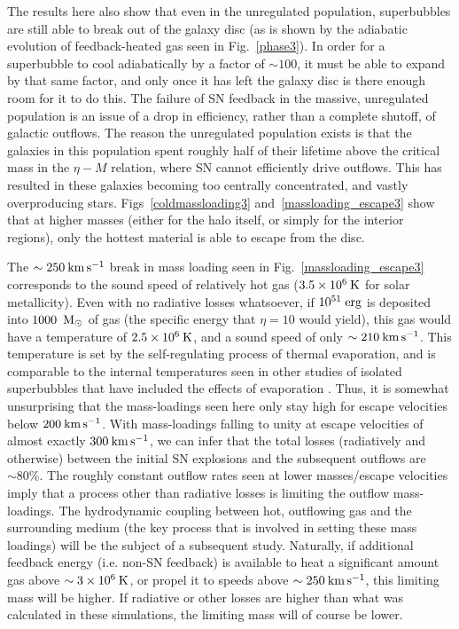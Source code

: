 The results here also show that even in the unregulated population, superbubbles
are still able to break out of the galaxy disc (as is shown by the adiabatic
evolution of feedback-heated gas seen in Fig.~\ref{phase3}).  In order for a
superbubble to cool adiabatically by a factor of $\sim100$, it must be able to
expand by that same factor, and only once it has left the galaxy disc is there
enough room for it to do this.  The failure of SN feedback in the massive,
unregulated population is an issue of a drop in efficiency, rather than a
complete shutoff, of galactic outflows.  The reason the unregulated population
exists is that the galaxies in this population spent roughly half of their
lifetime above the critical mass in the $\eta-M$ relation, where SN cannot
efficiently drive outflows.  This has resulted in these galaxies becoming too
centrally concentrated, and vastly overproducing stars.
Figs~\ref{coldmassloading3} and~\ref{massloading_escape3} show that at higher
masses (either for the halo itself, or simply for the interior regions), only
the hottest material is able to escape from the disc.  

The $\sim250\>{\rm km}\,{\rm s}^{-1}$ break in mass loading seen in
Fig.~\ref{massloading_escape3} corresponds to the sound speed of relatively hot
gas ($3.5\times10^6\>{\rm K}$ for solar metallicity).  Even with no radiative losses
whatsoever, if $10^{51}\;\rm{erg}$ is deposited into $1000\;\>{\rm M_{\odot}}$ of gas (the
specific energy that $\eta=10$ would  yield), this gas would have a temperature
of $2.5\times10^6\>{\rm K}$, and a sound speed of only $\sim210\>{\rm km}\,{\rm s}^{-1}$.  This
temperature is set by the self-regulating process of thermal evaporation, and is
comparable to the internal temperatures seen in other studies of isolated
superbubbles that have included the effects of evaporation
\citep{MacLow1988,Silich1996,Keller2014}.  Thus, it is somewhat unsurprising
that the mass-loadings seen here only stay high for escape velocities below
$200\>{\rm km}\,{\rm s}^{-1}$.  With mass-loadings falling to unity at escape velocities of almost
exactly $300\>{\rm km}\,{\rm s}^{-1}$, we can infer that the total losses (radiatively and
otherwise) between the initial SN explosions and the subsequent outflows are
$\sim80\%$.  The roughly constant outflow rates seen at lower masses/escape
velocities imply that a process other than radiative losses is limiting the
outflow mass-loadings.  The hydrodynamic coupling between hot, outflowing gas
and the surrounding medium (the key process that is involved in setting these
mass loadings) will be the subject of a subsequent study.  Naturally, if
additional feedback energy (i.e. non-SN feedback) is available to heat a
significant amount gas above $\sim3\times10^6\>{\rm K}$, or propel it to speeds
above $\sim250\>{\rm km}\,{\rm s}^{-1}$, this limiting mass will be higher. If radiative or other
losses are higher than what was calculated in these simulations, the limiting
mass will of course be lower.

